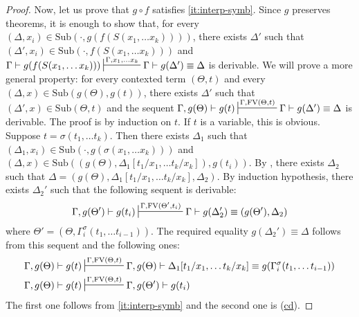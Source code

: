 \documentclass[reqno]{amsart}
\newcommand{\axref}[1]{(\hyperref[ax:#1]{#1})}
\theoremstyle{definition}
\theoremstyle{remark}
\newcommand{\fs}[1]{\mathrm{#1}}
\newcommand{\FV}{\fs{FV}}
\newcommand{\sub}{\fs{Sub}}
\numberwithin{figure}{section}
\begin{document}
\begin{proof}
Now, let us prove that $g \circ f$ satisfies \eqref{it:interp-symb}.
Since $g$ preserves theorems, it is enough to show that, for every $(\Delta,x_i) \in \sub(\cdot, g(f(S(x_1, \ldots x_k))))$, there exists $\Delta'$ such that $(\Delta',x_i) \in \sub(\cdot, f(S(x_1, \ldots x_k)))$ and $\Gamma \vdash g(f(S(x_1, \ldots x_k))) \sststile{}{\Gamma, x_1, \ldots x_k} \Gamma \vdash g(\Delta') \equiv \Delta$ is derivable.
We will prove a more general property: for every contexted term $(\Theta,t)$ and every $(\Delta,x) \in \sub(g(\Theta), g(t))$, there exists $\Delta'$ such that $(\Delta',x) \in \sub(\Theta, t)$ and the sequent $\Gamma, g(\Theta) \vdash g(t) \sststile{}{\Gamma, \FV(\Theta,t)} \Gamma \vdash g(\Delta') \equiv \Delta$ is derivable.
The proof is by induction on $t$.
If $t$ is a variable, this is obvious.
Suppose $t = \sigma(t_1, \ldots t_k)$.
Then there exists $\Delta_1$ such that $(\Delta_1,x_i) \in \sub(\cdot, g(\sigma(x_1, \ldots x_k)))$ and $(\Delta,x) \in \sub((g(\Theta),\Delta_1[t_1/x_1, \ldots t_k/x_k]), g(t_i))$.
By , there exists $\Delta_2$ such that $\Delta = (g(\Theta), \Delta_1[t_1/x_1, \ldots t_k/x_k], \Delta_2)$.
By induction hypothesis, there exists $\Delta_2'$ such that the following sequent is derivable:
\[ \Gamma, g(\Theta') \vdash g(t_i) \sststile{}{\Gamma, \FV(\Theta',t_i)} \Gamma \vdash g(\Delta_2') \equiv (g(\Theta'),\Delta_2) \]
where $\Theta' = (\Theta, \Gamma^\sigma_i(t_1, \ldots t_{i-1}))$.
The required equality $g(\Delta_2') \equiv \Delta$ follows from this sequent and the following ones:
\begin{align*}
\Gamma, g(\Theta) \vdash g(t) & \sststile{}{\Gamma, \FV(\Theta,t)} \Gamma, g(\Theta) \vdash \Delta_1[t_1/x_1, \ldots t_k/x_k] \equiv g(\Gamma^\sigma_i(t_1, \ldots t_{i-1})) \\
\Gamma, g(\Theta) \vdash g(t) & \sststile{}{\Gamma, \FV(\Theta,t)} \Gamma, g(\Theta') \vdash g(t_i)
\end{align*}
The first one follows from \eqref{it:interp-symb} and the second one is \axref{cd}.
\end{proof}
\end{document}
